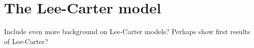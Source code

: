 \newpage
\section{The Lee-Carter model}
\label{section:Lee-Carter}
\textcolor{myDarkGreen}{
Include even more background on Lee-Carter models? Perhaps show first results of Lee-Carter?
\newline \newline
}


